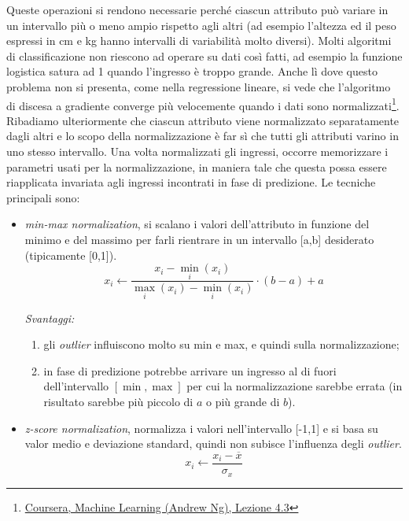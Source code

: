 Queste operazioni si rendono necessarie perché ciascun attributo può variare in un intervallo più o meno ampio rispetto agli altri (ad esempio l'altezza ed il peso espressi in cm e kg hanno intervalli di variabilità molto diversi). Molti algoritmi di classificazione non riescono ad operare su dati così fatti, ad esempio la funzione logistica satura ad 1 quando l'ingresso è troppo grande. Anche lì dove questo problema non si presenta, come nella regressione lineare, si vede che l'algoritmo di discesa a gradiente converge più velocemente quando i dati sono normalizzati\footnote{\href{http://www.youtube.com/watch?v=PINX6Mk636M}{Coursera, Machine Learning (Andrew Ng), Lezione 4.3} }. Ribadiamo ulteriormente  che ciascun attributo viene normalizzato separatamente dagli altri e lo scopo della normalizzazione è far sì che tutti gli attributi varino in uno stesso intervallo. Una volta normalizzati gli ingressi, occorre memorizzare i parametri usati per la normalizzazione, in maniera tale che questa possa essere riapplicata invariata agli ingressi incontrati in fase di predizione. Le tecniche principali sono:
\begin{itemize}
\item \emph{min-max normalization}, si scalano i valori dell'attributo in funzione del minimo e del massimo per farli rientrare in un intervallo [a,b] desiderato (tipicamente [0,1]).
\begin{equation*}
x_i \leftarrow \frac{x_i - \min_i(x_i)}{\max_i(x_i) - \min_i(x_i)} \cdot (b-a) +a
\end{equation*}

\emph{Svantaggi:} 
\begin{enumerate}
\item gli \emph{outlier} influiscono molto su min e max, e quindi sulla normalizzazione;
\item in fase di predizione potrebbe arrivare un ingresso al di fuori dell'intervallo $[\min, \max]$ per cui la normalizzazione sarebbe errata (in risultato sarebbe più piccolo di $a$ o più grande di $b$).
\end{enumerate}
\item \emph{z-score normalization}, normalizza i valori nell'intervallo [-1,1] e si basa su valor medio e deviazione standard, quindi non subisce l'influenza degli \emph{outlier}.
\begin{equation*}
x_i \leftarrow \frac{x_i - \overline{x}}{\sigma_{x}}
\end{equation*}

\end{itemize}

